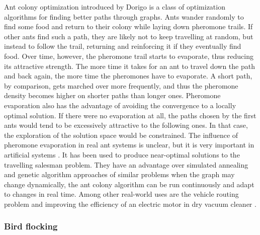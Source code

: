 Ant colony optimization  introduced by Dorigo \cite{Dorigo96Ants} is a class of optimization algorithms for finding better paths through graphs. Ants wander randomly to find some food and return to their colony while laying down pheromone trails. If other ants find such a path, they are likely not to keep travelling at random, but instead to follow the trail, returning and reinforcing it if they eventually find food. Over time, however, the pheromone trail starts to evaporate, thus reducing its attractive strength. The more time it takes for an ant to travel down the path and back again, the more time the pheromones have to evaporate. A short path, by comparison, gets marched over more frequently, and thus the pheromone density becomes higher on shorter paths than longer ones. Pheromone evaporation also has the advantage of avoiding the convergence to a locally optimal solution. If there were no evaporation at all, the paths chosen by the first ants would tend to be excessively attractive to the following ones. In that case, the exploration of the solution space would be constrained. The influence of pheromone evaporation in real ant systems is unclear, but it is very important in artificial systems \cite{Dorigo04Ants}. It has been used to produce near-optimal solutions to the travelling salesman problem. They have an advantage over simulated annealing and genetic algorithm approaches of similar problems when the graph may change dynamically, the ant colony algorithm can be run continuously and adapt to changes in real time. Among other real-world uses are the vehicle routing problem \cite{Rizzoli07AntsVehicle} and improving the efficiency of an electric motor in dry vacuum cleaner \cite{Korosec09AntsVacuum}.


\subsubsection{Bird flocking} %
\label{ssub:bird_flocking}

